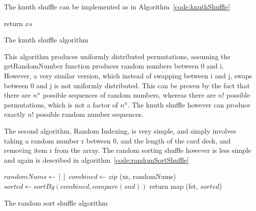 The knuth shuffle \parencite{knuth1997} can be implemented as in
Algorithm~\ref{code:knuthShuffle}

\vspace{0.3cm}

\begin{algorithm}[H]
    \BlankLine{}
     return $xs$\;
\caption{The knuth shuffle algorithm}%
\label{code:knuthShuffle}
\end{algorithm}

\vspace{0.3cm}

This algorithm produces uniformly distributed permutations, assuming the
getRandomNumber function produces random numbers between 0 and i. However,
a very similar version, which instead of swapping between i and j, swaps
between 0 and j is not uniformly distributed. This can be proven by
the fact that there are $n^n$ possible sequences of random numbers, whereas
there are ${n!}$ possible permutations, which is not a factor of $n^n$.
The knuth shuffle however can produce exactly ${n!}$ possible random number
sequences. \parencite{website:rici2015}

The second algorithm, Random Indexing, is very simple, and simply involves 
taking a random number r between 0, and the length of the card deck, and 
removing item r from the array. The random sorting shuffle however is less 
simple and again is described in algorithm~\ref{code:randomSortShuffle}

\vspace{0.3cm}

\begin{algorithm}[H]
    \BlankLine{}
     $randomNums \leftarrow []$\;
     
     $combined \leftarrow zip$ (xs, randomNums)\;
    $sorted \leftarrow sortBy ( combined, compare (snd))$\;
     return map (fst, $sorted$)\;
\caption{The random sort shuffle algorithm}%
\label{code:randomSortShuffle}
\end{algorithm}

